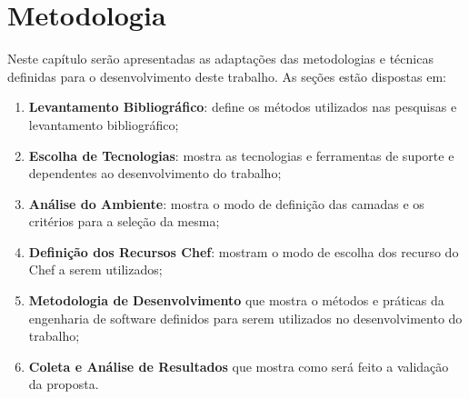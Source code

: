 \newpage\null\thispagestyle{empty}\newpage
\chapter{Metodologia}
\label{chap:metod}

Neste capítulo serão apresentadas as adaptações das metodologias e técnicas
definidas para o desenvolvimento deste trabalho. As seções estão dispostas
em:

\begin{enumerate}
  \item \textbf{Levantamento Bibliográfico}: define os métodos utilizados nas
    pesquisas e levantamento bibliográfico;
  \item \textbf{Escolha de Tecnologias}: mostra as tecnologias e
    ferramentas de suporte e dependentes ao desenvolvimento do trabalho;
  \item \textbf{Análise do Ambiente}: mostra o modo de definição das camadas e os critérios para
    a seleção da mesma;
  \item \textbf{Definição dos Recursos Chef}: mostram o modo de escolha dos recurso do Chef a serem utilizados;
  \item \textbf{Metodologia de Desenvolvimento} que mostra o métodos e práticas da engenharia de software
    definidos para serem utilizados no desenvolvimento do trabalho;
  \item \textbf{Coleta e Análise de Resultados} que mostra como será feito a validação da proposta.
\end{enumerate}







